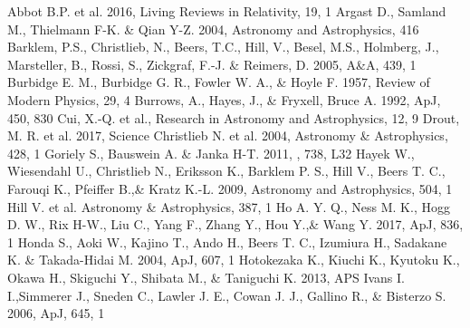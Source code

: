 \documentclass[a4paper,fleqn,usenatbib]{mnras}
\begin{document}
	
	\begin{thebibliography}{99}
		Abbot B.P. et al. 2016, Living Reviews in Relativity, 19, 1
		Argast D., Samland M., Thielmann F-K. \& Qian Y-Z. 2004, Astronomy and Astrophysics, 416
		Barklem, P.S., Christlieb, N., Beers, T.C., Hill, V., Besel, M.S., Holmberg, J., Marsteller, B., Rossi, S., Zickgraf, F.-J. \& Reimers, D. 2005, A\&A, 439, 1
		Burbidge E. M., Burbidge G. R., Fowler W. A., \& Hoyle F. 1957, Review of Modern Physics, 29, 4
		Burrows, A., Hayes, J., \& Fryxell, Bruce A. 1992, ApJ, 450, 830
		Cui, X.-Q. et al., Research in Astronomy and Astrophysics, 12, 9
		Drout, M. R. et al. 2017, Science
		Christlieb N. et al. 2004, Astronomy \& Astrophysics, 428, 1
		Goriely S., Bauswein A. \& Janka H-T. 2011, , 738, L32
		Hayek W., Wiesendahl U., Christlieb N., Eriksson K., Barklem P. S., Hill V., Beers T. C., Farouqi K., Pfeiffer B.,\& Kratz K.-L. 2009, Astronomy and Astrophysics, 504, 1
		Hill V. et al. Astronomy \& Astrophysics, 387, 1
		Ho A. Y. Q., Ness M. K., Hogg D. W., Rix H-W., Liu C., Yang F., Zhang Y., Hou Y.,\& Wang Y. 2017, ApJ, 836, 1
		Honda S., Aoki W., Kajino T., Ando H., Beers T. C., Izumiura H., Sadakane K. \& Takada-Hidai M. 2004, ApJ, 607, 1
		Hotokezaka K., Kiuchi K., Kyutoku K., Okawa H., Skiguchi Y., Shibata M., \& Taniguchi K. 2013, APS
		Ivans I. I.,Simmerer J., Sneden C., Lawler J. E., Cowan J. J., Gallino R., \& Bisterzo S. 2006, ApJ, 645, 1

\end{thebibliography}
\end{document}
